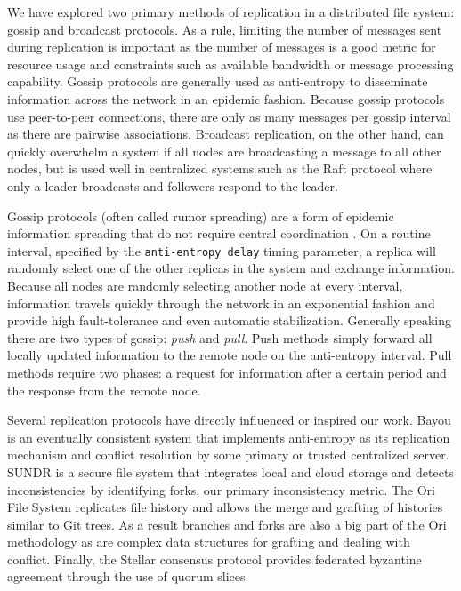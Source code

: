 \documentclass{article}
\begin{document}
We have explored two primary methods of replication in a distributed file system: gossip and broadcast protocols. As a rule, limiting the number of messages sent during replication is important as the number of messages is a good metric for resource usage and constraints such as available bandwidth or message processing capability. Gossip protocols are generally used as anti-entropy to disseminate information across the network in an epidemic fashion. Because gossip protocols use peer-to-peer connections, there are only as many messages per gossip interval as there are pairwise associations. Broadcast replication, on the other hand, can quickly overwhelm a system if all nodes are broadcasting a message to all other nodes, but is used well in centralized systems such as the Raft protocol where only a leader broadcasts and followers respond to the leader.

Gossip protocols (often called rumor spreading) are a form of epidemic information spreading that do not require central coordination \cite{kempe_gossip-based_2003, karp_randomized_2000}. On a routine interval, specified by the \texttt{anti-entropy delay} timing parameter, a replica will randomly select one of the other replicas in the system and exchange information. Because all nodes are randomly selecting another node at every interval, information travels quickly through the network in an exponential fashion and provide high fault-tolerance and even automatic stabilization. Generally speaking there are two types of gossip: \textit{push} and \textit{pull}. Push methods simply forward all locally updated information to the remote node on the anti-entropy interval. Pull methods require two phases: a request for information after a certain period and the response from the remote node.

Several replication protocols have directly influenced or inspired our work. Bayou \cite{terry_managing_1995,terry_session_1994} is an eventually consistent system that implements anti-entropy as its replication mechanism and conflict resolution by some primary or trusted centralized server. SUNDR \cite{li_secure_2004} is a secure file system that integrates local and cloud storage and detects inconsistencies by identifying forks, our primary inconsistency metric. The Ori File System \cite{mashtizadeh_replication_2013} replicates file history and allows the merge and grafting of histories similar to Git trees. As a result branches and forks are also a big part of the Ori methodology as are complex data structures for grafting and dealing with conflict. Finally, the Stellar consensus protocol \cite{mazieres_stellar_2015} provides federated byzantine agreement through the use of quorum slices.
\end{document}

